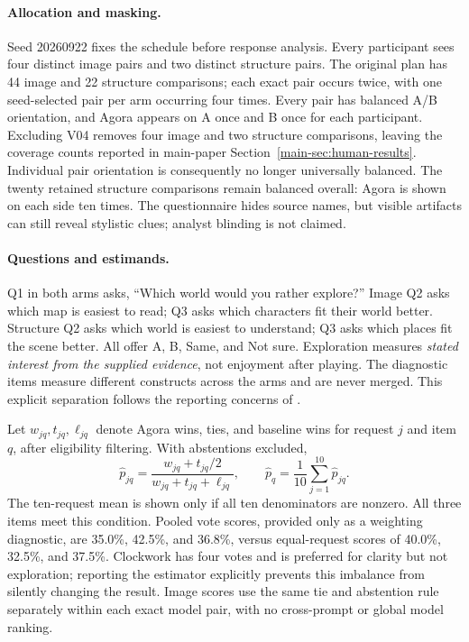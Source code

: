 \paragraph{Allocation and masking.}
Seed 20260922 fixes the schedule before response analysis. Every participant
sees four distinct image pairs and two distinct structure pairs. The original
plan has 44 image and 22 structure comparisons; each exact pair occurs twice,
with one seed-selected pair per arm occurring four times. Every pair has
balanced A/B orientation, and Agora appears on A once and B once for each
participant. Excluding V04 removes four image and two structure comparisons,
leaving the coverage counts reported in main-paper Section~\ref{main-sec:human-results}.
Individual pair orientation is consequently no longer universally balanced.
The twenty retained structure comparisons remain balanced overall: Agora is
shown on each side ten times. The questionnaire hides source names, but
visible artifacts can still reveal stylistic clues; analyst blinding is
not claimed.

\paragraph{Questions and estimands.}
Q1 in both arms asks, ``Which world would you rather explore?'' Image Q2 asks
which map is easiest to read; Q3 asks which characters fit their world better.
Structure Q2 asks which world is easiest to understand; Q3 asks which places
fit the scene better. All offer A, B, Same, and Not sure. Exploration measures
\emph{stated interest from the supplied evidence}, not enjoyment after playing.
The diagnostic items measure different constructs across the arms and are
never merged. This explicit separation follows the reporting concerns of
\citet{howcroft}.

Let $w_{jq},t_{jq},\ell_{jq}$ denote Agora wins, ties, and baseline wins for
request $j$ and item $q$, after eligibility filtering. With abstentions excluded,
\begin{equation}
\hat p_{jq}=\frac{w_{jq}+t_{jq}/2}{w_{jq}+t_{jq}+\ell_{jq}},
\qquad \hat p_q=\frac{1}{10}\sum_{j=1}^{10}\hat p_{jq}.
\end{equation}
The ten-request mean is shown only if all ten denominators are nonzero. All
three items meet this condition. Pooled vote scores, provided only as a
weighting diagnostic, are 35.0\%, 42.5\%, and 36.8\%, versus equal-request
scores of 40.0\%, 32.5\%, and 37.5\%. Clockwork has four votes and is preferred
for clarity but not exploration; reporting the estimator explicitly prevents
this imbalance from silently changing the result. Image scores use the same
tie and abstention rule separately within each exact model pair, with no
cross-prompt or global model ranking.

